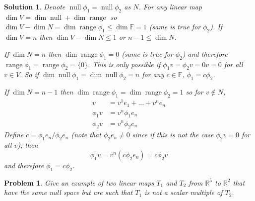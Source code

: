 \documentclass[11pt,a4paper]{scrartcl}
\DeclareMathOperator{\range}{range}
\DeclareMathOperator{\nspace}{null}
\theoremstyle{solve}
\newtheorem{problem}{Problem}
\newtheorem*{solution}{Solution}
\begin{document}
\begin{solution}
    Denote
    $\nspace \phi_1=\nspace \phi_2$ as $N$. For any linear map
    $\dim V = \dim \nspace + \dim \range$ so 
    $\dim V - \dim N = \dim \range \phi_1 \leq 
    \dim \mathbb{F}=1$ (same is true for $\phi_2$).
    If $\dim V=n$ then $\dim V - \dim N \leq 1$ or
    $n-1 \leq \dim N$.
    
    \noindent If $\dim N = n$ then $\dim \range \phi_1 = 0$ (same is true for $\phi_2$) and therefore
    $\range \phi_1 = \range \phi_2=\{0\}$. This is only possible if $\phi_1v=\phi_2v=0v=0$ for all $v \in V$.
    So if $\dim \nspace \phi_1 = \dim \nspace \phi_2=n$ for any
    $c \in \mathbb{F}$, $\phi_1=c\phi_2$. 

    \noindent If $\dim N=n-1$ then $\dim \range \phi_1 = \dim \range \phi_2=1$
    so for $v \notin N$,
    \begin{align*}
    v & = v^1 e_1 + \ldots + v^n e_n \\
    \phi_1 v & =  v^n \phi_1 e_n \\
    \phi_2 v & =  v^n \phi_2 e_n        
    \end{align*}
    Define $c=\phi_1 e_n / \phi_2 e_n$ (note that $\phi_2 e_n \neq 0$ since
    if this is not the case $\phi_2 v =0$ for all $v$); then
    \[
    \phi_1 v = v^n (c\phi_2 e_n) = c \phi_2 v
    \]
    and therefore $\phi_1=c\phi_2$.
\end{solution}
\begin{problem}
    Give an example of two linear maps $T_1$ and $T_2$ from
    $\mathbb{R}^5$ to $\mathbb{R}^2$ that have the same null space
    but are such that $T_1$ is not a scalar multiple of $T_2$.
\end{problem}
\end{document}
